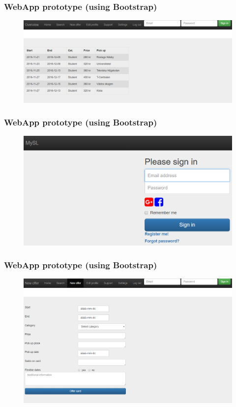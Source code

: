 \documentclass{beamer}
\begin{document}
\begin{frame}
\frametitle{WebApp prototype (using Bootstrap)}
\begin{figure}
\includegraphics[width=\textwidth]{png/webapp-overview.png}
\end{figure}
\end{frame}


\begin{frame}
\frametitle{WebApp prototype (using Bootstrap)}
\begin{figure}
\includegraphics[width=\textwidth]{png/webapp-login.png}
\end{figure}
\end{frame}


\begin{frame}
\frametitle{WebApp prototype (using Bootstrap)}
\begin{figure}
\includegraphics[width=\textwidth]{png/webapp-newoffer.png}
\end{figure}
\end{frame}
\end{document}
